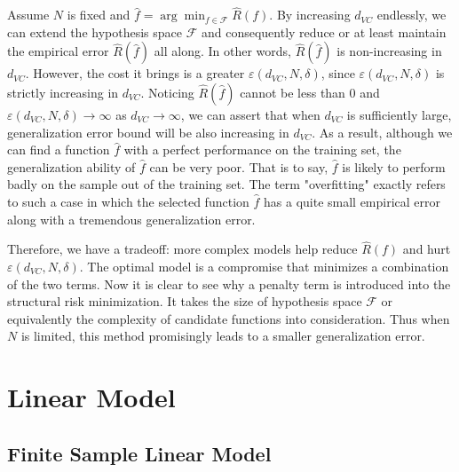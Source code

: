 \documentclass{report}
\theoremstyle{nonumberplain}
\newcommand{\0}{\mathbf{0}}
\begin{document}
Assume $N$ is fixed and $\hat{f}=\arg\min_{f\in\mathcal{F}}\widehat{R}(f).$ By increasing $d_{VC}$ endlessly, we can extend the hypothesis space $\mathcal{F}$ and consequently reduce or at least maintain the empirical error $\widehat{R}(\hat{f})$ all along. In other words, $\widehat{R}(\hat{f})$ is non-increasing in $d_{VC}$. However, the cost it brings is a greater $\varepsilon(d_{VC}, N, \delta)$, since $\varepsilon(d_{VC}, N, \delta)$ is strictly increasing in $d_{VC}$. Noticing $\widehat{R}(\hat{f})$ cannot be less than 0 and $\varepsilon(d_{VC}, N, \delta)\to\infty$ as $d_{VC}\to\infty$, we can assert that when $d_{VC}$ is sufficiently large, generalization error bound will be also increasing in $d_{VC}$. As a result, although we can find a function $\hat{f}$ with a perfect performance on the training set, the generalization ability of $\hat{f}$ can be very poor. That is to say, $\hat{f}$ is likely to perform badly on the sample out of the training set. The term "overfitting" exactly refers to such a case in which the selected function $\hat{f}$ has a quite small empirical error along with a tremendous generalization error. 

Therefore, we have a tradeoff: more complex models help reduce $\widehat{R}(f)$
and hurt $\varepsilon(d_{VC}, N, \delta)$. The optimal model is a compromise that minimizes a combination of the two terms. Now it is clear to see why a penalty term is introduced into the structural risk minimization. It takes the size of hypothesis space $\mathcal{F}$ or equivalently the complexity of candidate functions into consideration. Thus when $N$ is limited, this method promisingly leads to a smaller generalization error.






\chapter{Linear Model}
\section{Finite Sample Linear Model}
\end{document}
